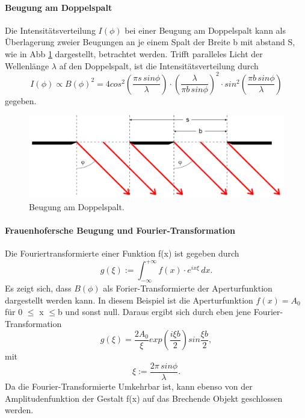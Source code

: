 \paragraph{Beugung am Doppelspalt}
Die Intensitätsverteilung $I(\phi)$ bei einer Beugung am Doppelspalt kann als Überlagerung zweier Beugungen an je 
einem Spalt der Breite b mit abstand S, wie in Abb \ref{fig:c} dargestellt, betrachtet werden.
Trifft paralleles Licht der Wellenlänge $\lambda$ af den Doppelspalt, ist die Intensitätsverteilung durch 
\begin{equation}
    \label{eq:7}
    I(\phi) \propto B(\phi)^2 = 4 cos^2\left(\frac{\pi s \, sin \phi}{\lambda}\right) \cdot \left(\frac{\lambda}{\pi b \, sin \phi}\right)^2 \cdot sin^2 \left(\frac{\pi b \, sin \phi}{\lambda}\right)
\end{equation}
gegeben.
\begin{figure}[H]
    \centering
    \includegraphics{Doppelspalt.png}
    \caption{Beugung am Doppelspalt.}
    \label{fig:c}
\end{figure}

\paragraph{Frauenhofersche Beugung und Fourier-Transformation}
Die Fouriertransformierte einer Funktion f(x) ist gegeben durch
\begin{equation}
    \label{eq:8}
    g(\xi) :=  \int_{- \infty}^{+ \infty} f(x) \cdot e^{ix \xi} \,dx.
\end{equation}
Es zeigt sich, dass $B(\phi)$ als Forier-Transformierte der Aperturfunktion dargestellt werden kann.
In diesem Beispiel ist die Aperturfunktion $f(x) = A_0$ für 0 $\leq$ x $\leq $b und sonst null.
Daraus ergibt sich durch eben jene Fourier-Transformation
\begin{equation}
    \label{eq:9}
    g(\xi) = \frac{2 A_0}{\xi} exp \left(\frac{i \xi b}{2}\right) sin \frac{\xi b}{2},
\end{equation}
mit
\begin{equation}
    \label{eq:10}
    \xi := \frac{2 \pi \, sin \phi}{\lambda}.
\end{equation}
Da die Fourier-Transformierte Umkehrbar ist, kann ebenso von der Amplitudenfunktion der Gestalt f(x) auf das Brechende 
Objekt geschlossen werden.

